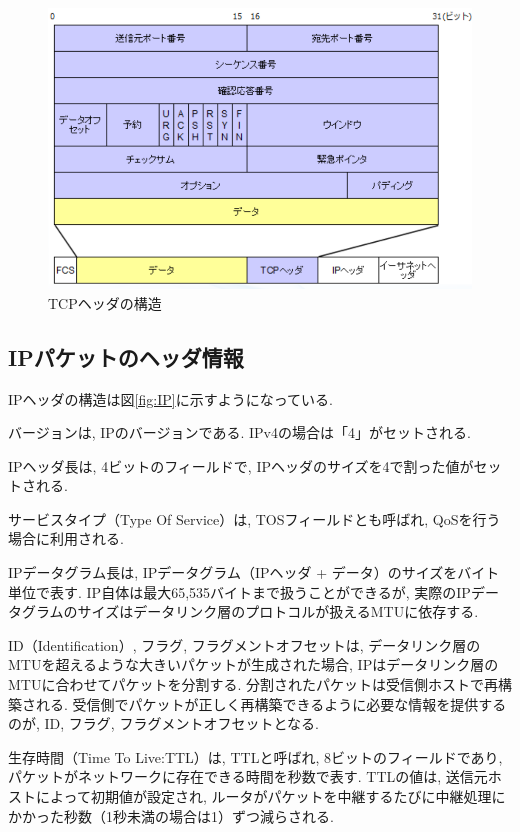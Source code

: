 \documentclass{ltjsarticle} %
\begin{document}
\begin{figure}[H] %
  \centering
  \includegraphics[width=1.0\textwidth]{TCP.png} %
  \caption{TCPヘッダの構造} %
  \label{fig:TCP} %
\end{figure}

\subsection{IPパケットのヘッダ情報}
IPヘッダの構造は図\ref{fig:IP}に示すようになっている. 

バージョンは, IPのバージョンである. IPv4の場合は「4」がセットされる. 

IPヘッダ長は, 4ビットのフィールドで, IPヘッダのサイズを4で割った値がセットされる. 

サービスタイプ（Type Of Service）は, TOSフィールドとも呼ばれ, QoSを行う場合に利用される. 

IPデータグラム長は, IPデータグラム（IPヘッダ + データ）のサイズをバイト単位で表す. 
IP自体は最大65,535バイトまで扱うことができるが, 実際のIPデータグラムのサイズはデータリンク層のプロトコルが扱えるMTUに依存する. 

ID（Identification）, フラグ, フラグメントオフセットは, データリンク層のMTUを超えるような大きいパケットが生成された場合, 
IPはデータリンク層のMTUに合わせてパケットを分割する. 
分割されたパケットは受信側ホストで再構築される. 受信側でパケットが正しく再構築できるように必要な情報を提供するのが, ID, 
フラグ, フラグメントオフセットとなる. 

生存時間（Time To Live:TTL）は, TTLと呼ばれ, 8ビットのフィールドであり, パケットがネットワークに存在できる時間を秒数で表す. 
TTLの値は, 送信元ホストによって初期値が設定され, ルータがパケットを中継するたびに中継処理にかかった秒数（1秒未満の場合は1）ずつ減らされる. 
\end{document}
